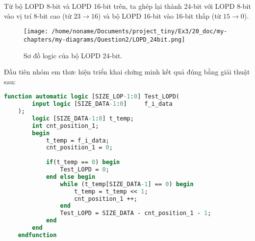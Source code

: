 Từ bộ LOPD 8-bit và LOPD 16-bit trên, ta ghép lại thành 24-bit với LOPD 8-bit vào vị trí 8-bit cao (từ $ 23 \rightarrow 16 $) và bộ LOPD 16-bit vào 16-bit thấp (từ $ 15 \rightarrow 0 $).

\begin{figure}[H]
	\centering
	\texttt{[image: /home/noname/Documents/project\_tiny/Ex3/20\_doc/my-chapters/my-diagrams/Question2/LOPD\_24bit.png]}
	\caption{Sơ đồ logic của bộ LOPD 24-bit.}
\end{figure}











Đầu tiên nhóm em thưc hiện triển khai chứng minh kết quả đúng bằng giải thuật sau:

\begin{lstlisting}[style=StyleCode, language=SystemVerilog, caption={Giải thuật chứng minh kết quả của bộ LOPD 24-bit.}]
	function automatic logic [SIZE_LOP-1:0] Test_LOPD(
		input logic [SIZE_DATA-1:0]     f_i_data
	);
		logic [SIZE_DATA-1:0] t_temp;
		int cnt_position_1;
		begin
			t_temp = f_i_data;
			cnt_position_1 = 0;
			
			if(t_temp == 0) begin
				Test_LOPD = 0;
			end else begin
				while (t_temp[SIZE_DATA-1] == 0) begin
					t_temp = t_temp << 1;
					cnt_position_1 ++;
				end
				Test_LOPD = SIZE_DATA - cnt_position_1 - 1;
			end
		end
	endfunction
\end{lstlisting}


